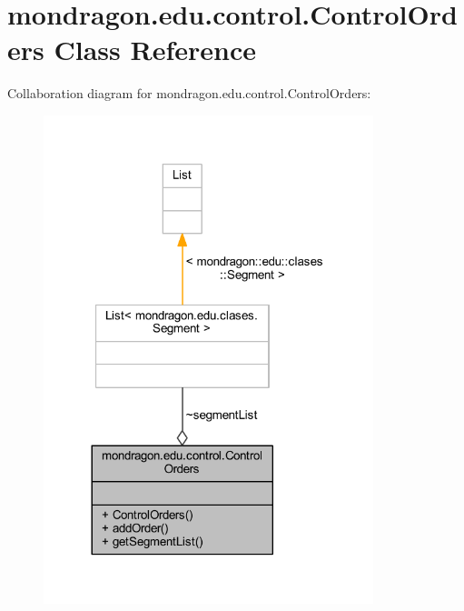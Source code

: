 \hypertarget{classmondragon_1_1edu_1_1control_1_1_control_orders}{}\section{mondragon.\+edu.\+control.\+Control\+Orders Class Reference}
\label{classmondragon_1_1edu_1_1control_1_1_control_orders}


Collaboration diagram for mondragon.\+edu.\+control.\+Control\+Orders\+:
\nopagebreak
\begin{figure}[H]
\begin{center}
\leavevmode
\includegraphics[width=272pt]{classmondragon_1_1edu_1_1control_1_1_control_orders__coll__graph}
\end{center}
\end{figure}
